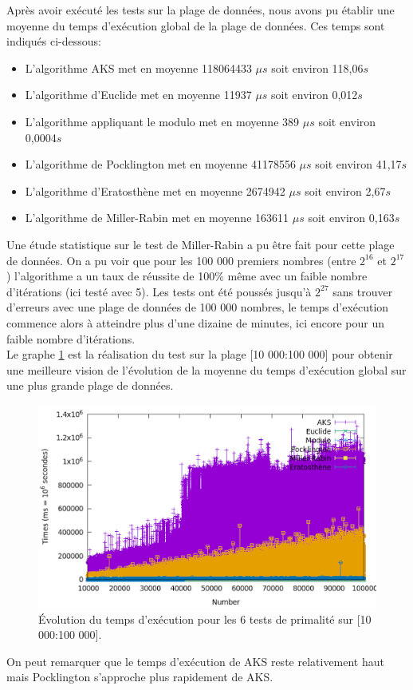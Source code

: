 Après avoir exécuté les tests sur la plage de données, nous avons pu établir une moyenne du temps d'exécution global de la plage de données. Ces temps sont indiqués ci-dessous:
\begin{itemize}
	\item L'algorithme AKS met en moyenne 118064433 $\mu s$ soit environ 118,06$s$
	\item L'algorithme d'Euclide met en moyenne 11937 $\mu s$ soit environ 0,012$s$
	\item L'algorithme appliquant le modulo met en moyenne 389 $\mu s$ soit environ 0,0004$s$
	\item L'algorithme de Pocklington met en moyenne 41178556 $\mu s$ soit environ 41,17$s$
	\item L'algorithme d'Eratosthène met en moyenne 2674942 $\mu s$ soit environ 2,67$s$
	\item L'algorithme de Miller-Rabin met en moyenne 163611 $\mu s$ soit environ 0,163$s$
\end{itemize}

 Une étude statistique sur le test de Miller-Rabin a pu être fait pour cette plage de données. On a pu voir que pour les 100 000 premiers nombres (entre $2^{16}$ et $2^{17}$) l’algorithme a un taux de réussite de 100\% même avec un faible nombre d’itérations (ici testé avec 5). Les tests ont été poussés jusqu’à $2^{27}$ sans trouver d’erreurs avec une plage de données de 100 000 nombres, le temps d’exécution commence alors à atteindre plus d’une dizaine de minutes, ici encore pour un faible nombre d’itérations.\\
 
 Le graphe \ref{fg:fig9} est la réalisation du test sur la plage [10 000:100 000] pour obtenir une meilleure vision de l'évolution de la moyenne du temps d'exécution global sur une plus grande plage de données.
 \begin{figure}[!ht]
 		\begin{center}\includegraphics[scale=0.5]{RANGE2.png}\end{center}
		\caption{Évolution du temps d'exécution pour les 6 tests de primalité sur [10 000:100 000]. }
		\label{fg:fig9}
	\end{figure}
	On peut remarquer que le temps d’exécution de AKS reste relativement haut mais Pocklington s'approche plus rapidement de AKS.
 
